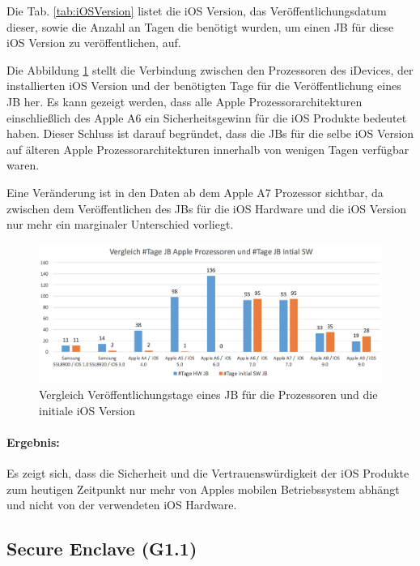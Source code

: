Die Tab. \ref{tab:iOSVersion} listet die iOS Version, das Veröffentlichungsdatum dieser, sowie die Anzahl an Tagen die benötigt wurden, um einen JB für diese iOS Version zu veröffentlichen, auf.  \par 
Die Abbildung \ref{fig:VergleichJBProzessorSW} stellt die Verbindung zwischen den Prozessoren des iDevices, der installierten iOS Version und der benötigten Tage für die Veröffentlichung eines JB her. Es kann gezeigt werden, dass alle Apple Prozessorarchitekturen einschließlich des Apple A6 ein Sicherheitsgewinn für die iOS Produkte bedeutet haben. Dieser Schluss ist darauf begründet, dass die JBs für die selbe iOS Version auf älteren Apple Prozessorarchitekturen innerhalb von wenigen Tagen verfügbar waren. \par 

Eine Veränderung ist in den Daten ab dem Apple A7 Prozessor sichtbar, da zwischen dem Veröffentlichen des JBs für die iOS Hardware und die iOS Version nur mehr ein marginaler Unterschied vorliegt.
\newpage
\begin{figure}[htbp!]
        \centering
                \includegraphics[scale=0.55]{Bilder/iDeviceJB-SW-HW.png}
         \caption{Vergleich Veröffentlichungstage eines JB für die Prozessoren und die initiale iOS Version \protect\footnotemark}
        \label{fig:VergleichJBProzessorSW}      
\end{figure}

\paragraph{Ergebnis:} Es zeigt sich, dass die Sicherheit und die Vertrauenswürdigkeit der iOS Produkte zum heutigen Zeitpunkt nur mehr von Apples mobilen Betriebssystem abhängt und nicht von der verwendeten iOS Hardware. 
%
\subsection{Secure Enclave  (G1.1)}
\label{sec:Frage1SecureEnclave}
 
